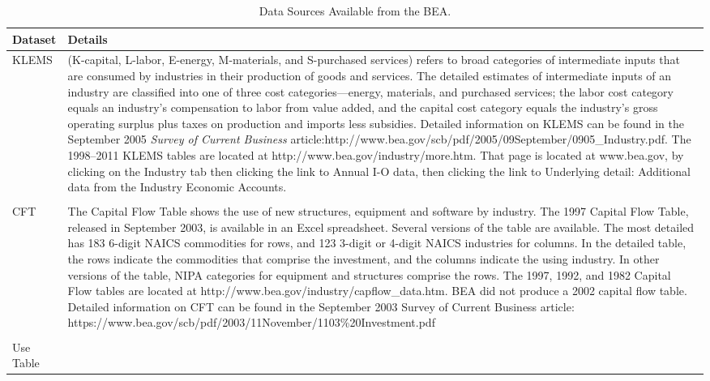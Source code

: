 \begin{table}
\caption[Data Sources Available from the BEA]{Data Sources Available from the BEA.}
\begin{center}
  \begin{tabular}{l @{\hspace{2em}} p{10cm}}
   \toprule 
    Dataset & Details  \\ 

	\midrule
KLEMS &
(K-capital, L-labor, E-energy, M-materials, and S-purchased services) refers to broad categories of intermediate inputs that are consumed by industries in their production of goods and services.  The detailed estimates of intermediate inputs of an industry are classified into one of three cost categories—energy, materials, and purchased services; the labor cost category equals an industry’s compensation to labor from value added, and the capital cost category equals the industry’s gross operating surplus plus taxes on production and imports less subsidies.  Detailed information on KLEMS can be found in the September 2005 \emph{ Survey of Current Business} article:http://www.bea.gov/scb/pdf/2005/09September/0905\_Industry.pdf. The 1998--2011 KLEMS tables are located at 
 http://www.bea.gov/industry/more.htm. That page is located at  www.bea.gov, by clicking on the Industry tab then clicking the link to Annual I-O data, then clicking the link to Underlying detail: Additional data from the Industry Economic Accounts. \\
 & \\
CFT & 
The Capital Flow Table shows the use of new structures, equipment and software by industry. The 1997 Capital Flow Table, released in September 2003, is available in an Excel spreadsheet. Several versions of the table are available. The most detailed has 183 6-digit NAICS commodities for rows, and 123 3-digit or 4-digit NAICS industries for columns. In the detailed table, the rows indicate the commodities that comprise the investment, and the columns indicate the using industry. In other versions of the table, NIPA categories for equipment and structures comprise the rows. The 1997, 1992, and 1982 Capital Flow tables are located at http://www.bea.gov/industry/capflow\_data.htm.  BEA did not produce a 2002 capital flow table. Detailed information on CFT can be found in the September 2003 Survey of Current Business article:
https://www.bea.gov/scb/pdf/2003/11November/1103\%20Investment.pdf\\
 & \\
Use Table & 

\end{tabular}
\end{center}
\end{table}
